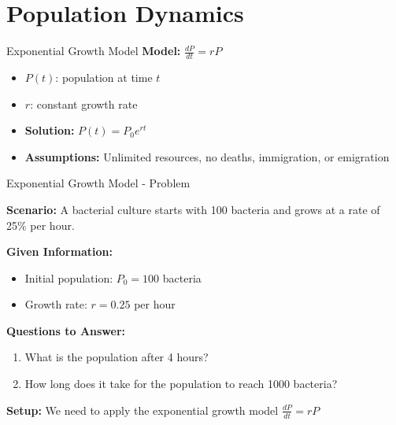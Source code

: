 \documentclass[10pt,aspectratio=169]{beamer}
\begin{document}
\section{Population Dynamics}
\begin{frame}{Exponential Growth Model}
    \textbf{Model:} $\frac{dP}{dt} = rP$
    \begin{itemize}
        \item $P(t)$: population at time $t$
        \item $r$: constant growth rate
        \item \textbf{Solution:} $P(t) = P_0 e^{rt}$
        \item \textbf{Assumptions:} Unlimited resources, no deaths, immigration, or emigration
    \end{itemize}
\end{frame}

\begin{frame}{Exponential Growth Model - Problem}
    \begin{problembox}
        \textbf{Scenario:} A bacterial culture starts with 100 bacteria and grows at a rate of 25\% per hour.
        
        \textbf{Given Information:}
        \begin{itemize}
            \item Initial population: $P_0 = 100$ bacteria
            \item Growth rate: $r = 0.25$ per hour
        \end{itemize}
        
        \textbf{Questions to Answer:}
        \begin{enumerate}
            \item What is the population after 4 hours?
            \item How long does it take for the population to reach 1000 bacteria?
        \end{enumerate}
        
        \textbf{Setup:} We need to apply the exponential growth model $\frac{dP}{dt} = rP$
    \end{problembox}
\end{frame}
\end{document}
